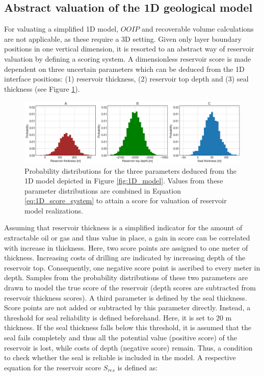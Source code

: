 	        \subsection{Abstract valuation of the 1D geological model}\label{sec:1D_score_system}
	        For valuating a simplified 1D model, $OOIP$ and recoverable volume calculations are not applicable, as these require a 3D setting. Given only layer boundary positions in one vertical dimension, it is resorted to an abstract way of reservoir valuation by defining a scoring system. A dimensionless reservoir score is made dependent on three uncertain parameters which can be deduced from the 1D interface positions: (1) reservoir thickness, (2) reservoir top depth and (3) seal thickness (see Figure \ref{fig:3_parameters}).
	        	
	        \begin{figure}[h]
	        	\centering
	        	\includegraphics[width=1\textwidth]{Figures/3_parameters.png}
	        	\caption{Probability distributions for the three parameters deduced from the 1D model depicted in Figure \ref{fig:1D_model}. Values from these parameter distributions are combined in Equation \ref{eq:1D_score_system} to attain a score for valuation of reservoir model realizations.}\label{fig:3_parameters}
	        \end{figure}
	        
	        Assuming that reservoir thickness is a simplified indicator for the amount of extractable oil or gas and thus value in place, a gain in score can be correlated with increase in thickness. Here, two score points are assigned to one meter of thickness. Increasing costs of drilling are indicated by increasing depth of the reservoir top. Consequently, one negative score point is ascribed to every meter in depth. Samples from the probability distributions of these two parameters are drawn to model the true score of the reservoir (depth scores are subtracted from reservoir thickness scores).
	        A third parameter is defined by the seal thickness. Score points are not added or subtracted by this parameter directly. Instead, a threshold for seal reliability is defined beforehand. Here, it is set to 20 m thickness. If the seal thickness falls below this threshold, it is assumed that the seal fails completely and thus all the potential value (positive score) of the reservoir is lost, while costs of depth (negative score) remain. Thus, a condition to check whether the seal is reliable is included in the model. A respective equation for the reservoir score $S_{res}$ is defined as:
			

